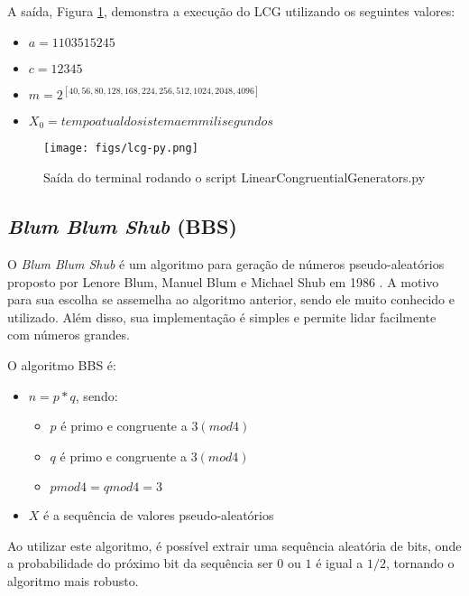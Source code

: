 \documentclass{article}
\begin{document}
A saída, Figura \ref{fig:lcg-partial}, demonstra a execução do LCG utilizando os seguintes valores\cite{bib:lcg2}:
\begin{itemize}
	    \item $a = 1103515245$
	    \item $c = 12345$
	    \item $m = 2^{[40, 56, 80, 128, 168, 224, 256, 512, 1024, 2048, 4096]}$
	    \item $X_0 = tempo atual do sistema em milisegundos$
\end{itemize}

\begin{figure}[h!]
	\centering
	\texttt{[image: figs/lcg-py.png]}
	\caption{Saída do terminal rodando o script LinearCongruentialGenerators.py}
	\label{fig:lcg-partial}
\end{figure}

\subsection{\textit{Blum Blum Shub} (BBS)}

O \textit{Blum Blum Shub} é um algoritmo para geração de números pseudo-aleatórios proposto por Lenore Blum, Manuel Blum e Michael Shub em 1986 \cite{bib:bbs1}.
A motivo para sua escolha se assemelha ao algoritmo anterior, sendo ele muito conhecido e utilizado. Além disso, sua implementação é simples e permite lidar facilmente com números grandes\cite{bib:livro}.

O algoritmo BBS é:

{
    \begin{itemize}
	    \item $n = p * q$, sendo:
	    \begin{itemize}
	        \item $p$ é primo e congruente a $3 (mod 4)$
	        \item $q$ é primo e congruente a $3 (mod 4)$
	        \item $p mod 4 = q mod 4 = 3$
	    \end{itemize}
	    \item $X$ é a sequência de valores pseudo-aleatórios
    \end{itemize}
}

Ao utilizar este algoritmo, é possível extrair uma sequência aleatória de bits, onde a probabilidade do próximo bit da sequência ser $0$ ou $1$ é igual a $1/2$, tornando o algoritmo mais robusto.
\end{document}
